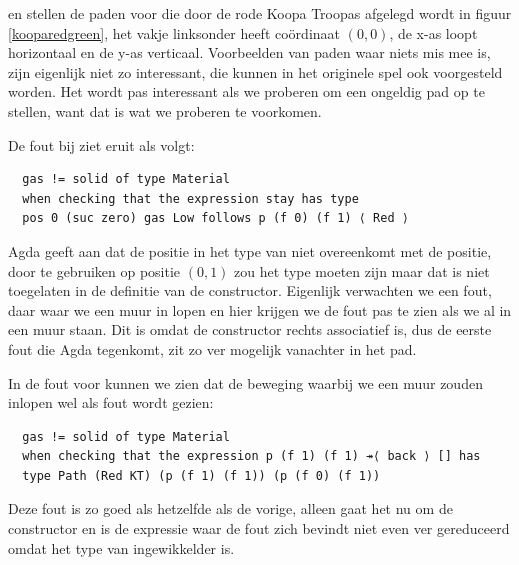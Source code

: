 
 en  stellen de paden voor die door de
rode Koopa Troopas afgelegd wordt in figuur \ref{kooparedgreen}, het vakje
linksonder heeft coördinaat $(0,0)$, de x-as loopt horizontaal en de y-as
verticaal. Voorbeelden van paden waar niets mis mee is, zijn eigenlijk niet zo
interessant, die kunnen in het originele spel ook voorgesteld worden. Het wordt
pas interessant als we proberen om een ongeldig pad op te stellen, want dat is
wat we proberen te voorkomen.


De fout bij  ziet eruit als volgt:

\begin{verbatim}
  gas != solid of type Material
  when checking that the expression stay has type
  pos 0 (suc zero) gas Low follows p (f 0) (f 1) ⟨ Red ⟩
\end{verbatim}

Agda geeft aan dat de positie in het type van  niet overeenkomt met
de positie, door  te gebruiken op positie $(0,1)$ zou het type
 moeten zijn maar dat is niet toegelaten in de definitie van de constructor.
Eigenlijk verwachten we een fout, daar waar we een muur in lopen en hier
krijgen we de fout pas te zien als we al in een muur staan. Dit is omdat de
 constructor rechts associatief is, dus de eerste fout die Agda
tegenkomt, zit zo ver mogelijk vanachter in het pad.

In de fout voor  kunnen we zien dat de beweging waarbij
we een muur zouden inlopen wel als fout wordt gezien:

\begin{verbatim}
  gas != solid of type Material
  when checking that the expression p (f 1) (f 1) ↠⟨ back ⟩ [] has
  type Path (Red KT) (p (f 1) (f 1)) (p (f 0) (f 1))
\end{verbatim}

Deze fout is zo goed als hetzelfde als de vorige, alleen gaat het nu om de
 constructor en is de expressie waar de fout zich bevindt niet even
ver gereduceerd omdat het type van  ingewikkelder is.

